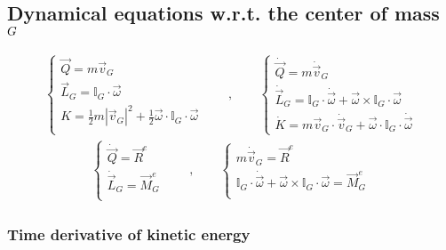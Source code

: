 \documentclass[letterpaper,10pt,english]{jupyterBook}
\begin{document}
\subsection{Dynamical equations w.r.t. the center of mass \protect\(G\protect\)}
\label{\detokenize{ch/dynamics-eom-rigid:dynamical-equations-w-r-t-the-center-of-mass-g}}
\sphinxAtStartPar
{}
\begin{equation*}
\begin{split}
\begin{cases}
 \vec{Q} = m \vec{v}_G \\
 \vec{L}_G = \mathbb{I}_G \cdot \vec{\omega} \\
 K = \frac{1}{2} m |\vec{v}_G|^2 + \frac{1}{2} \vec{\omega} \cdot \mathbb{I}_G \cdot \vec{\omega} \\
\end{cases}
\qquad , \qquad
\begin{cases}
 \dot{\vec{Q}} = m \dot{\vec{v}}_G \\
 \dot{\vec{L}}_G = \mathbb{I}_G \cdot \dot{\vec{\omega}} + \vec{\omega} \times \mathbb{I}_G \cdot \vec{\omega} \\
 \dot{K} = m \vec{v}_G \cdot \dot{\vec{v}}_G + \vec{\omega} \cdot \mathbb{I}_G \cdot \dot{\vec{\omega}}
\end{cases}
\end{split}
\end{equation*}
\sphinxAtStartPar
{}
\begin{equation*}
\begin{split}
\begin{cases}
 \dot{\vec{Q}} = \vec{R}^e \\
 \dot{\vec{L}}_G = \vec{M}_G^e \\
\end{cases}
\qquad , \qquad
\begin{cases}
 m \dot{\vec{v}}_G = \vec{R}^e \\
 \mathbb{I}_G \cdot \dot{\vec{\omega}} + \vec{\omega} \times \mathbb{I}_G \cdot \vec{\omega} = \vec{M}_G^e \\
\end{cases}
\end{split}
\end{equation*}\subsubsection*{Time derivative of kinetic energy}
\end{document}

